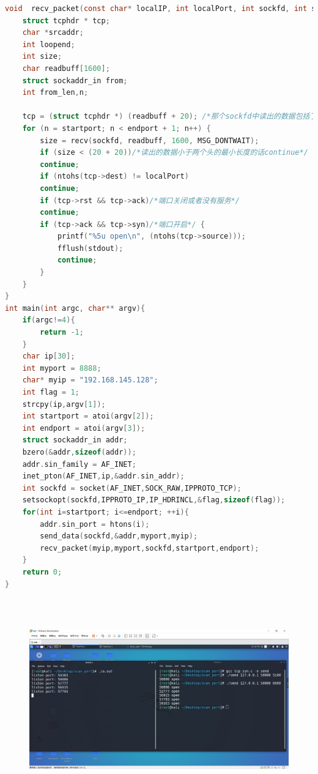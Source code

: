 \documentclass[11pt,a4paper]{article}
\begin{document}
\begin{lstlisting}[language=C]
void  recv_packet(const char* localIP, int localPort, int sockfd, int startport, int endport) {
    struct tcphdr * tcp;
    char *srcaddr;
    int loopend;
    int size;
    char readbuff[1600];
    struct sockaddr_in from;
    int from_len,n;

    tcp = (struct tcphdr *) (readbuff + 20); /*那个sockfd中读出的数据包括了IP头的所以+20*/
    for (n = startport; n < endport + 1; n++) {
        size = recv(sockfd, readbuff, 1600, MSG_DONTWAIT);
        if (size < (20 + 20))/*读出的数据小于两个头的最小长度的话continue*/
        continue;
        if (ntohs(tcp->dest) != localPort)
        continue;
        if (tcp->rst && tcp->ack)/*端口关闭或者没有服务*/
        continue;
        if (tcp->ack && tcp->syn)/*端口开启*/ {
            printf("%5u open\n", (ntohs(tcp->source)));
            fflush(stdout);
            continue;
        }
    }
}
int main(int argc, char** argv){
    if(argc!=4){
        return -1;
    }
    char ip[30];
    int myport = 8888;
    char* myip = "192.168.145.128";
    int flag = 1;
    strcpy(ip,argv[1]);
    int startport = atoi(argv[2]);
    int endport = atoi(argv[3]);
    struct sockaddr_in addr;
    bzero(&addr,sizeof(addr));
    addr.sin_family = AF_INET;
    inet_pton(AF_INET,ip,&addr.sin_addr);
    int sockfd = socket(AF_INET,SOCK_RAW,IPPROTO_TCP);
    setsockopt(sockfd,IPPROTO_IP,IP_HDRINCL,&flag,sizeof(flag));
    for(int i=startport; i<=endport; ++i){
        addr.sin_port = htons(i);
        send_data(sockfd,&addr,myport,myip);
        recv_packet(myip,myport,sockfd,startport,endport);
    }
    return 0;
}
\end{lstlisting}
\begin{figure}[H]
    \centering
    \includegraphics[width=16cm,height=8.7cm]{./figure/27.png}
\end{figure}
\end{document}
